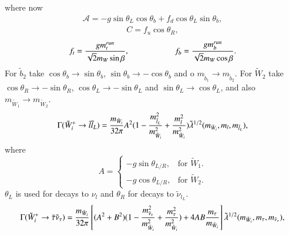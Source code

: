 \documentclass[final,3p,times]{elsarticle}
\begin{document}
where now
\begin{equation}
\begin{aligned}
\mathcal{A} = -g\sin\theta_L\cos\theta_b + f_d \cos\theta_L\sin\theta_b,
\end{aligned}
\end{equation}
\begin{equation}
\begin{aligned}
C = f_u \cos\theta_R,
\end{aligned}
\end{equation}
\begin{equation}
\begin{aligned}
f_t = {g m_{t}^{run} \over \sqrt{2} m_W \sin{\beta} }, \: \: \: \: \: \: \: \: \: \: \: \: \: \: \: \: \: \: \: \: \: \: \: \: \:   f_b = {g m_{b}^{run} \over \sqrt{2} m_W \cos\beta}.
\end{aligned}
\end{equation}
For $\tilde{b}_2$ take $\cos\theta_b \rightarrow \sin\theta_b$, $\sin\theta_b \rightarrow -\cos\theta_b$ and o $m_{\tilde{b}_1} \rightarrow m_{\tilde{b}_2}$.
For $\tilde{W}_2$ take $\cos\theta_R \rightarrow -\sin\theta_R$, $\cos\theta_L \rightarrow -\sin\theta_L$ and $\sin\theta_L \rightarrow \cos\theta_L$, and also $m_{\tilde{W}_1} \rightarrow m_{\tilde{W}_2}$.
\begin{equation}\label{chllL}
\begin{aligned}
\Gamma (\tilde{W}_i^+ \rightarrow \bar{l} \tilde{l}_{L}) = {m_{\tilde{W}_i} \over 32\pi} A^2 (1- {m_{\tilde{l}_L}^2 \over m_{\tilde{W}_i}^2} + {m_{l}^2 \over m_{\tilde{W}_i}^2})  \tilde{\lambda}^{1/2}(m_{\tilde{W}_i},m_l, m_{\tilde{l}_L}),
\end{aligned}
\end{equation} 
where
\begin{equation}
  A=\begin{cases}
    -g \sin\theta_{L/R}, & \text{for $\tilde{W}_1$}.\\
    -g \cos\theta_{L/R}, & \text{for $\tilde{W}_2$}.
  \end{cases}
\end{equation}
$\theta_L$ is used for decays to $\nu_l$ and $\theta_R$ for decays to $\tilde{\nu}_{l_L}$.
\begin{equation}
\begin{aligned}\label{chtaunutau}
\Gamma (\tilde{W}_i^+ \rightarrow \bar{\tau} \tilde{\nu}_{\tau}) = {m_{\tilde{W}_i} \over 32\pi} \left[(A^2 + B^2)( 1 - {m_{\tilde{\nu}_{\tau}}^2 \over m_{\tilde{W}_{i}}^2} + {m_{\tau}^2 \over m_{\tilde{W}_{i}}^2 }) + 4AB {m_{\tau} \over m_{\tilde{W}_i}}\right] \tilde{\lambda}^{1/2}(m_{\tilde{W}_i},m_{\tau}, m_{\tilde{\nu}_{\tau}}),
\end{aligned}
\end{equation} 
\end{document}
